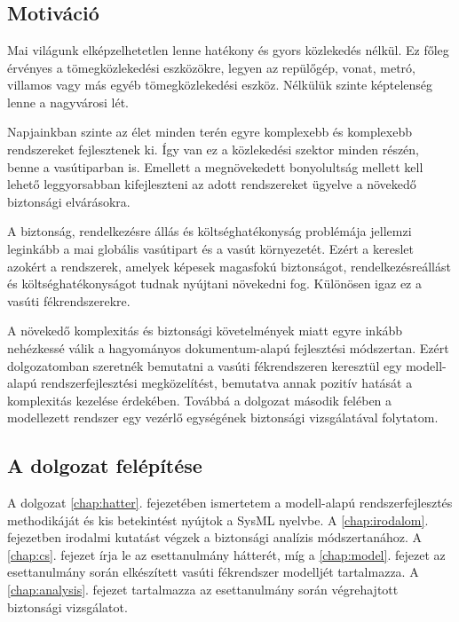 \chapter{\bevezetes}
\section{Motiváció}
Mai világunk elképzelhetetlen lenne hatékony és gyors közlekedés nélkül.
Ez főleg érvényes a tömegközlekedési eszközökre, legyen az repülőgép, vonat, metró, villamos vagy más egyéb tömegközlekedési eszköz.
Nélkülük szinte képtelenség lenne a nagyvárosi lét.

Napjainkban szinte az élet minden terén egyre komplexebb és komplexebb rendszereket fejlesztenek ki.
Így van ez a közlekedési szektor minden részén, benne a vasútiparban is.
Emellett a megnövekedett bonyolultság mellett kell lehető leggyorsabban kifejleszteni az adott rendszereket ügyelve a növekedő biztonsági elvárásokra.

A biztonság, rendelkezésre állás és költséghatékonyság problémája jellemzi leginkább a mai globális vasútipart és a vasút környezetét.
Ezért a kereslet azokért a rendszerek, amelyek képesek magasfokú biztonságot, rendelkezésreállást és költséghatékonyságot tudnak nyújtani növekedni fog.
Különösen igaz ez a vasúti fékrendszerekre.

A növekedő komplexitás és biztonsági követelmények miatt egyre inkább nehézkessé válik a hagyományos dokumentum-alapú fejlesztési módszertan.
Ezért dolgozatomban szeretnék bemutatni a vasúti fékrendszeren keresztül egy modell-alapú rendszerfejlesztési megközelítést, bemutatva annak pozitív hatását a komplexitás kezelése érdekében.
Továbbá a dolgozat második felében a modellezett rendszer egy vezérlő egységének biztonsági vizsgálatával folytatom.

\section{A dolgozat felépítése}
A dolgozat \ref{chap:hatter}. fejezetében ismertetem a modell-alapú rendszerfejlesztés methodikáját és kis betekintést nyújtok a SysML nyelvbe.
A \ref{chap:irodalom}. fejezetben irodalmi kutatást végzek a biztonsági analízis módszertanához.
A \ref{chap:cs}. fejezet írja le az esettanulmány hátterét, míg a \ref{chap:model}. fejezet az esettanulmány során elkészített vasúti fékrendszer modelljét tartalmazza.
A \ref{chap:analysis}. fejezet tartalmazza az esettanulmány során végrehajtott biztonsági vizsgálatot.